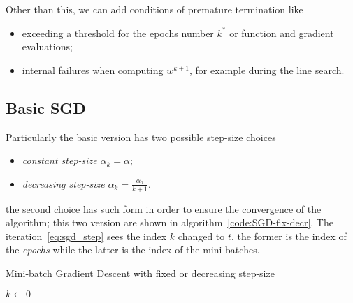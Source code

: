 Other than this, we can add conditions of premature termination like
\begin{itemize}
\item exceeding a threshold for the epochs number $k^\ast$ or function and gradient evaluations;
\item internal failures when computing $w^{k+1}$, for example during the line search.
\end{itemize}

\subsection{Basic SGD}

Particularly the basic version has two possible step-size choices
\begin{itemize}
\item \emph{constant step-size} $\alpha_k=\alpha$;
\item \emph{decreasing step-size} $\alpha_k=\frac{\alpha_0}{k+1}$.
\end{itemize}
the second choice has such form in order to ensure the convergence of the algorithm; this two version are shown in algorithm~\vref{code:SGD-fix-decr}. The iteration~\eqref{eq:sgd_step} sees the index $k$ changed to $t$, the former is the index of the \emph{epochs} while the latter is the index of the mini-batches.


\begin{algorithm}
\caption{Mini-batch Gradient Descent with fixed or decreasing step-size}\label{code:SGD-fix-decr}
$k \gets 0$\;
\end{algorithm}


